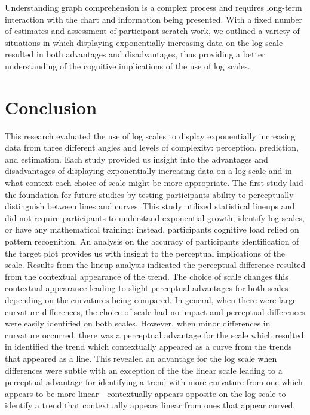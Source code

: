 \documentclass[print]{nuthesis}
\begin{document}
Understanding graph comprehension is a complex process and requires long-term interaction with the chart and information being presented.
With a fixed number of estimates and assessment of participant scratch work, we outlined a variety of situations in which displaying exponentially increasing data on the log scale resulted in both advantages and disadvantages, thus providing a better understanding of the cognitive implications of the use of log scales.

\hypertarget{conclusion}{%
\chapter{Conclusion}\label{conclusion}}

This research evaluated the use of log scales to display exponentially increasing data from three different angles and levels of complexity: perception, prediction, and estimation.
Each study provided us insight into the advantages and disadvantages of displaying exponentially increasing data on a log scale and in what context each choice of scale might be more appropriate.
The first study laid the foundation for future studies by testing participants ability to perceptually distinguish between lines and curves.
This study utilized statistical lineups and did not require participants to understand exponential growth, identify log scales, or have any mathematical training; instead, participants cognitive load relied on pattern recognition.
An analysis on the accuracy of participants identification of the target plot provides us with insight to the perceptual implications of the scale.
Results from the lineup analysis indicated the perceptual difference resulted from the contextual appearance of the trend.
The choice of scale changes this contextual appearance leading to slight perceptual advantages for both scales depending on the curvatures being compared.
In general, when there were large curvature differences, the choice of scale had no impact and perceptual differences were easily identified on both scales.
However, when minor differences in curvature occurred, there was a perceptual advantage for the scale which resulted in identified the trend which contextually appeared as a curve from the trends that appeared as a line.
This revealed an advantage for the log scale when differences were subtle with an exception of the the linear scale leading to a perceptual advantage for identifying a trend with more curvature from one which appears to be more linear - contextually appears opposite on the log scale to identify a trend that contextually appears linear from ones that appear curved.
\end{document}
